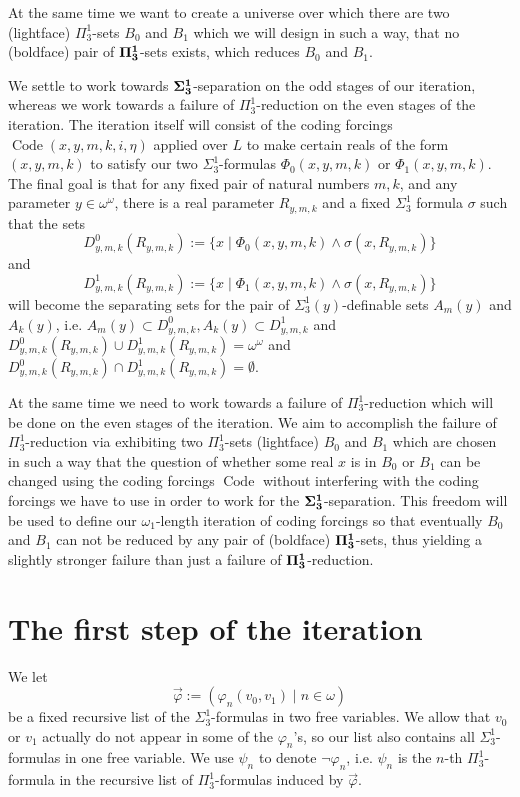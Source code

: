 \documentclass[a4paper,11pt]{article}
\begin{document}
At the same time we want to create a universe over which there are two (lightface) $\Pi^1_3$-sets $B_0$ and $B_1$ which we will design in such a way, that no (boldface) pair of $\bf{\Pi}^1_3$-sets exists, which reduces $B_0$ and $B_1$.

We settle to work towards $\bf{\Sigma}^1_3$-separation on the odd stages of our iteration, whereas we work towards a failure of $\Pi^1_3$-reduction on the even stages of the iteration.
The iteration itself will consist of the coding forcings $\operatorname{Code} (x,y,m,k,i,\eta)$ applied over $L$ to make certain reals of the form $(x,y,m,k)$ to satisfy our two $\Sigma^1_3$-formulas $\Phi_0 (x,y,m,k)$ or $\Phi_1(x,y,m,k)$. The final goal is that for any fixed pair of natural numbers $m,k$,  and any parameter $y \in \omega^{\omega}$, there is a real parameter $R_{y,m,k}$ and a fixed $\Sigma^1_3$ formula $\sigma$ such that the sets
\[ D^0_{y,m,k} (R_{y,m,k} ) := \{ x \mid  \Phi_0 (x,y,m,k) \land \sigma (x,R_{y,m,k}) \} \]
and 
\[ D^1_{y,m,k} (R_{y,m,k} ) := \{ x \mid \Phi_1 (x,y,m,k) \land \sigma (x,R_{y,m,k}) \} \]
will become the separating sets for the pair of $\Sigma^1_3 (y)$-definable sets $A_m(y)$ and $A_k(y)$, i.e. $A_m  (y) \subset D^0_{y,m,k}, A_k(y) \subset D^1_{y,m,k}$ and $D^0_{y,m,k} (R_{y,m,k} ) \cup D^1_{y,m,k} (R_{y,m,k} ) = \omega^{\omega}$ and 
$D^0_{y,m,k} (R_{y,m,k} ) \cap D^1_{y,m,k} (R_{y,m,k} ) = \emptyset$.

At the same time we need to work towards a failure of ${\Pi}^1_3$-reduction which will be done on the even stages of the iteration. We aim to accomplish the failure of $\Pi^1_3$-reduction via exhibiting two $\Pi^1_3$-sets (lightface) $B_0$ and $B_1$ which are chosen in such a way that the question of whether some real $x$ is in $B_0$ or $B_1$ can be changed using the coding forcings $\operatorname{Code}$ without interfering with the coding forcings we have to use in order to work for the $\bf{\Sigma}^1_3$-separation. This freedom will be used to define our $\omega_1$-length iteration of coding forcings so that eventually $B_0$ and $B_1$ can not be reduced by any pair of (boldface) $\bf{\Pi}^1_3$-sets, thus yielding a slightly stronger failure than just a failure of $\bf{\Pi}^1_3$-reduction.



\section{The first step of the iteration}
We let
\[\vec{\varphi} :=  (\varphi_n (v_0,v_1) \mid n \in \omega ) \]
be a fixed recursive list of the $\Sigma^1_3$-formulas in two free variables. We allow that $v_0$ or $v_1$ actually do not appear in some of the $\varphi_n$'s, so our list also contains all $\Sigma^1_3$-formulas in one free variable. We use $\psi_n $ to denote $\lnot \varphi_n$, i.e. $\psi_n$ is the $n$-th $\Pi^1_3$-formula in the recursive list of $\Pi^1_3$-formulas induced by $\vec{\varphi}$.
\end{document}

